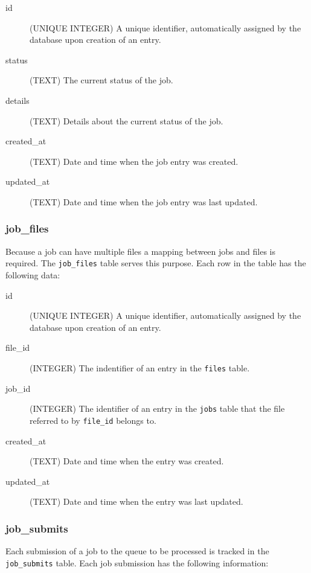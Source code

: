 \documentclass[12pt]{article}
\begin{document}
\begin{description}
    \item[id] (UNIQUE INTEGER)  A unique identifier, automatically assigned by the database upon creation of an entry.
    \item[status] (TEXT) The current status of the job.
    \item[details] (TEXT) Details about the current status of the job.
    \item[created\_at] (TEXT) Date and time when the job entry was created.
    \item[updated\_at] (TEXT) Date and time when the job entry was last updated.
\end{description}

\subsubsection{job\_files}
Because a job can have multiple files a mapping between jobs and files is required. The \texttt{job\_files} table serves this purpose. Each row in the table has the following data:

\begin{description}
    \item[id] (UNIQUE INTEGER)  A unique identifier, automatically assigned by the database upon creation of an entry.
    \item[file\_id] (INTEGER) The indentifier of an entry in the \texttt{files} table.
    \item[job\_id] (INTEGER) The identifier of an entry in the \texttt{jobs} table that the file referred to by \texttt{file\_id} belongs to.
    \item[created\_at] (TEXT) Date and time when the entry was created.
    \item[updated\_at] (TEXT) Date and time when the entry was last updated.
\end{description}

\subsubsection{job\_submits}
Each submission of a job to the queue to be processed is tracked in the \texttt{job\_submits} table. Each job submission has the following information:
\end{document}
